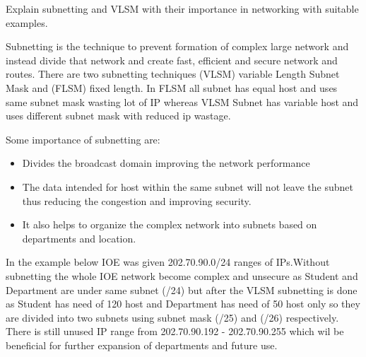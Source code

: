 \documentclass[a4paper,11pt]{article}
\begin{document}

\begin{Q}
    {
        Explain subnetting and VLSM with their importance in networking with suitable examples.
    }
\end{Q}

\begin{A}
    {
        Subnetting is the technique to prevent formation of complex large network and instead divide that network and create fast, efficient and secure network and routes.
        There are two subnetting techniques  (VLSM) variable Length Subnet Mask and (FLSM) fixed length. In FLSM all subnet has equal host and uses same subnet mask wasting lot of IP whereas  VLSM  Subnet has variable host and uses different subnet mask with reduced ip wastage.

        Some importance of subnetting are:
        \begin{itemize}
            \item Divides the broadcast domain improving the network performance
            \item The data intended for host within the same subnet will not leave the subnet thus reducing the congestion and improving security.
            \item It also helps to organize the complex network into subnets based on departments and location.
        \end{itemize}




        In the example below IOE was given 202.70.90.0/24  ranges of IPs.Without subnetting the whole IOE network become complex and unsecure as  Student and Department are under same subnet (/24) but after the VLSM subnetting is done  as Student has need of 120 host and Department has need of 50 host only so they are divided into two subnets using subnet mask (/25) and (/26) respectively.  There is still unused IP range from 202.70.90.192 - 202.70.90.255 which wil be beneficial for further expansion of departments and future use.

}
\end{A}
\end{document}
